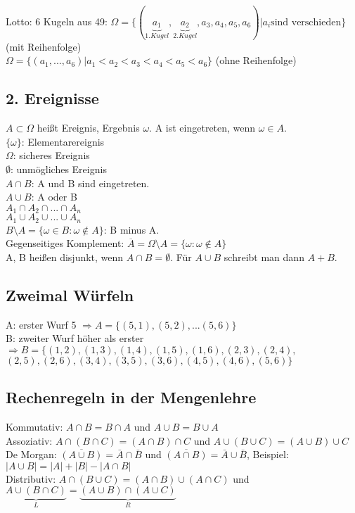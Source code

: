 Lotto: 6 Kugeln aus 49: $ \Omega=\{(\underbrace{a_1}_{1. Kugel}, \underbrace{a_2}_{2. Kugel}, a_3, a_4, a_5, a_6) | a_i \textrm{sind verschieden} \}$ (mit Reihenfolge)\\
$ \Omega=\{(a_1,...,a_6) | a_1 < a_2 < a_3 < a_4 < a_5 < a_6\}$ (ohne Reihenfolge)\\

\subsection{2. Ereignisse}
$ A \subset \Omega$ heißt Ereignis, Ergebnis $ \omega $. A ist eingetreten, wenn $\omega \in A$. \\
$\{\omega\} $: Elementarereignis\\
$ \Omega $: sicheres Ereignis\\
$\emptyset $: unmögliches Ereignis\\
$A \cap B$: A und B sind eingetreten.\\
$A\cup B$: A oder B\\
$A_1\cap A_2\cap ... \cap A_n$\\
$A_1\cup A_2\cup ... \cup A_n$\\
$B \setminus A= \{\omega \in B : \omega \notin A \} $: B minus A. \\
Gegenseitiges Komplement: $ \overline{A} = \Omega \setminus A = \{\omega : \omega \notin A \}$\\
A, B heißen disjunkt, wenn $ A \cap B = \emptyset $. Für $ A \cup B $ schreibt man dann $A+B$.\\

\subsection{Zweimal Würfeln}
A: erster Wurf 5 $\Rightarrow A=\{(5,1),(5,2),...(5,6)\}$\\
B: zweiter Wurf höher als erster 
$\Rightarrow B = \{ (1,2), (1,3), (1,4), (1,5), (1,6), (2,3), (2,4), $
$(2,5), (2,6), (3,4), (3,5), (3,6), (4,5), (4,6), (5,6) \} $

\subsection{Rechenregeln in der Mengenlehre}
Kommutativ: $ A\cap B = B\cap A $ und $ A\cup B = B\cup A $\\
Assoziativ: $ A\cap (B\cap C) = (A\cap B) \cap C$ und $ A\cup (B\cup C) = (A\cup B) \cup C$ \\
De Morgan: $ \overline{(A\cup B)} = \bar{A}\cap \bar{B} $ und $ \overline{(A\cap B)} = \bar{A} \cup \bar{B}$, Beispiel: $ |A\cup B| = |A|+|B|-|A\cap B|$ \\
Distributiv: $ A \cap (B\cup C) = (A\cap B)\cup (A\cap C)$ und $ \underbrace{A\cup (B\cap C)}_{L} = \underbrace{(A\cup B) \cap (A\cup C)}_{R}$

